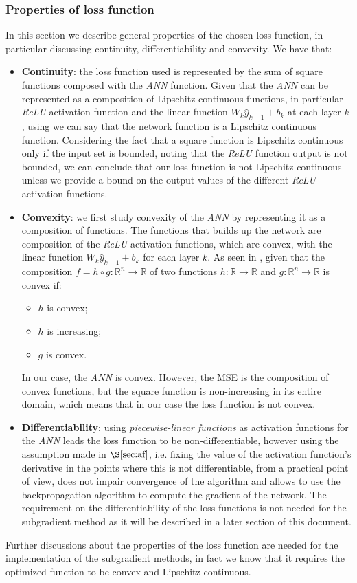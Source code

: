\subsubsection{Properties of loss function}
In this section we describe general properties of the chosen loss function, in particular discussing continuity, differentiability and convexity.
We have that:
\begin{itemize}
    \item \textbf{Continuity}: the loss function used is represented by the sum of square functions composed with the \textit{ANN} function. Given that the \textit{ANN} can be represented as a composition of Lipschitz continuous functions, in particular \textit{ReLU} activation function and the linear function $W_k\hat{y}_{k-1} + b_k$ at each layer $k$, using \parencite[Claim 12.7]{ml} we can say that the network function is a Lipschitz continuous function. Considering the fact that a square function is Lipschitz continuous only if the input set is bounded, noting that the \textit{ReLU} function output is not bounded, we can conclude that our loss function is not Lipschitz continuous unless we provide a bound on the output values of the different \textit{ReLU} activation functions.
    \item \textbf{Convexity}: we first study convexity of the \textit{ANN} by representing it as a composition of functions. The functions that builds up the network are composition of the \textit{ReLU} activation functions, which are convex, with the linear function $W_k\hat{y}_{k-1} + b_k$ for each layer $k$. As seen in \parencite[Chap. 3.2.4]{boyd}, given that the composition $f=h\circ g:\mathbb{R}^n\to\mathbb{R}$ of two functions $h:\mathbb{R}\to\mathbb{R}$ and $g:\mathbb{R}^n\to\mathbb{R}$ is convex if:
        \begin{itemize}
            \item $h$ is convex;
            \item $h$ is increasing;
            \item $g$ is convex.
        \end{itemize}
    In our case, the \textit{ANN} is convex. However, the MSE is the composition of convex functions, but the square function is non-increasing in its entire domain, which means that in our case the loss function is not convex.
    \item \textbf{Differentiability}: using \textit{piecewise-linear functions} as activation functions for the \textit{ANN} leads the loss function to be non-differentiable, however using the assumption made in $\S\ref{sec:af}$, i.e. fixing the value of the activation function's derivative in the points where this is not differentiable, from a practical point of view, does not impair convergence of the algorithm and allows to use the backpropagation algorithm to compute the gradient of the network. The requirement on the differentiability of the loss functions is not needed for the subgradient method as it will be described in a later section of this document.
\end{itemize}
Further discussions about the properties of the loss function are needed for the implementation of the subgradient methods, in fact we know that it requires the optimized function to be convex and Lipschitz continuous. 